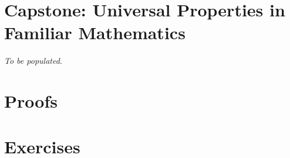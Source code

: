 \section{Capstone: Universal Properties in Familiar Mathematics}
\textit{To be populated.}

\clearpage

\clearpage

\section*{Proofs}
\clearpage

\section*{Exercises}

\clearpage

